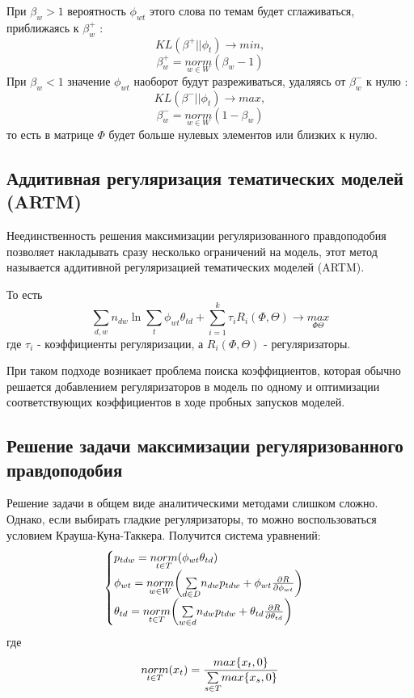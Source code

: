 При $\beta_w>1$ вероятность $\phi_{wt}$ этого слова по темам будет сглаживаться, приближаясь к $\beta_w^+$ : 
$$
KL(\beta^+||\phi_t) \rightarrow min,
$$
$$
\beta_w^+=\underset{w \in W}{norm}(\beta_w-1)
$$
При $\beta_w<1$ значение $\phi_{wt}$ наоборот будут разреживаться, удаляясь от $\beta_w^-$ к нулю : 
$$
KL(\beta^-||\phi_t) \rightarrow max,
$$
$$
\beta_w^-=\underset{w \in W}{norm}(1-\beta_w)
$$
то есть в матрице $\Phi$ будет больше нулевых элементов или близких к нулю.

\subsection{Аддитивная регуляризация тематических моделей (ARTM)}

Неединственность решения максимизации регуляризованного правдоподобия позволяет накладывать сразу несколько ограничений на модель, этот метод называется аддитивной регуляризацией тематических моделей (ARTM).

То есть
$$
\sum_{d,w}{n_{dw} \ln{\sum_t\phi_{wt} \theta_{td}}} + \sum_{i=1}^k \tau_i R_i(\Phi,\Theta) \rightarrow \underset{\Phi\Theta}{max}
$$
где $\tau_i$ - коэффициенты регуляризации, а $R_i(\Phi,\Theta)$ - регуляризаторы.

При таком подходе возникает проблема поиска коэффициентов, которая обычно решается добавлением регуляризаторов в модель по одному и оптимизации соответствующих коэффициентов в ходе пробных запусков моделей.

\subsection{Решение задачи максимизации регуляризованного правдоподобия}
Решение задачи в общем виде аналитическими методами слишком сложно. Однако, если выбирать гладкие регуляризаторы, то можно воспользоваться условием Крауша-Куна-Таккера. Получится система уравнений:
$$
\begin{cases}
    p_{tdw} = \underset{t \in T}{norm}(\phi_{wt} \theta_{td}) \\
    \phi_{wt} = \underset{w \in W}{norm}\bigg( \underset{d \in D}\sum{n_{dw} p_{tdw} + \phi_{wt} {{\partial R} \over {\partial \phi_{wt}}}} \bigg) \\
    \theta_{td} = \underset{t \in T}{norm}\bigg( \underset{w \in d}\sum{n_{dw} p_{tdw} + \theta_{td} {{\partial R} \over {\partial \theta_{td}}}} \bigg) \\
\end{cases}
$$
где
$$
\underset{t \in T}{norm}(x_t) = {{max\{ x_t, 0 \}} \over {\underset{s \in T}\sum{ max\{ x_s, 0 \}} }}
$$

